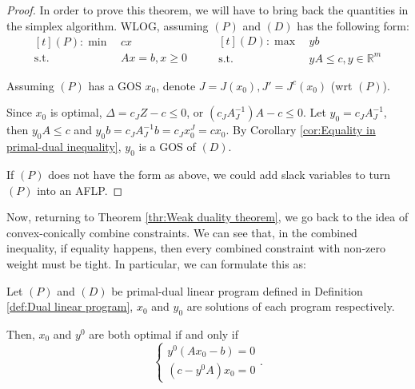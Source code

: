 \begin{proof}
  In order to prove this theorem, we will have to bring back the quantities in
  the simplex algorithm. WLOG, assuming \( (P) \) and \( (D) \) has the
  following form:
  \begin{equation*}
    \begin{aligned}[t]
      (P): \min\,&cx\\
    \text{s.t.}\, &Ax = b, x \ge 0
  \end{aligned}
  \qquad
  \begin{aligned}[t]
    (D): \max\,&yb\\
    \text{s.t.}\, &yA \le c, y \in \mathbb{R}^{m}
  \end{aligned}
  \end{equation*}

Assuming \( (P) \) has a GOS \( x_{0} \), denote \( J = J(x_{0}), J' =
J^{c}(x_{0}) \) (wrt \( (P) \)).

Since \( x_{0} \) is optimal, \( \Delta = c_{J}Z - c \le 0 \), or \(
(c_{J}A_{J}^{-1})A - c \le 0 \). Let \( y_{0} = c_{J}A^{-1}_{J} \), then \(
y_{0}A \le c \) and \( y_{0}b = c_{J}A^{-1}_{J}b = c_{J}x_{0}^{J} = cx_{0} \). 
By Corollary \ref{cor:Equality in primal-dual inequality}, \( y_{0} \) is a GOS
of \( (D) \).

If \( (P) \) does not have the form as above, we could add slack variables to
turn \( (P) \) into an AFLP.
\end{proof}

Now, returning to Theorem \ref{thr:Weak duality theorem}, we go back to the idea
of convex-conically combine constraints. We can see that, in the combined
inequality, if equality happens, then every combined constraint with non-zero
weight must be tight. In particular, we can formulate this as:

\begin{theorem}
\label{thr:Complementary Slackness Theorem}
  Let \( (P) \) and \( (D) \) be primal-dual linear program defined in
  Definition \ref{def:Dual linear program}, \( x_{0} \) and \( y_{0} \) are
  solutions of each program respectively.

  Then, \( x_{0} \) and \( y^{0} \) are both optimal if and only if
  \[
    \begin{cases}
      y^{0}(Ax_{0} - b) = 0\\
      (c - y^{0}A)x_{0} = 0
    \end{cases}
  .\] 
\end{theorem}

